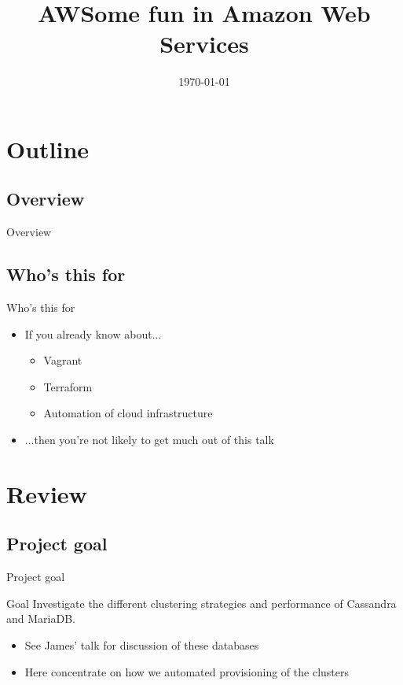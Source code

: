 \documentclass[xcolor=dvipsnames]{beamer}
\title{AWSome fun in Amazon Web Services}
\date{\today}
\begin{document}
\begin{frame}
\titlepage
\end{frame}

\section*{Outline}
\subsection*{Overview}
\begin{frame}{Overview}
  \tableofcontents[hideallsubsections]
\end{frame}

\subsection*{Who's this for}
\begin{frame}{Who's this for}
  \begin{itemize}
    \item If you already know about...
    \begin{itemize}
      \item Vagrant
      \item Terraform
      \item Automation of cloud infrastructure
    \end{itemize}
    \item ...then you're not likely to get much out of this talk \smiley
  \end{itemize}
\end{frame}


\section{Review}
\subsection{Project goal}
\begin{frame}{Project goal}
  \begin{block}{Goal}
    Investigate the different clustering strategies and performance of
    Cassandra and MariaDB.
  \end{block}
  \pause
  \begin{itemize}
    \item See James' talk for discussion of these databases
    \item Here concentrate on how we automated provisioning of the clusters
  \end{itemize}
\end{frame}
\end{document}
